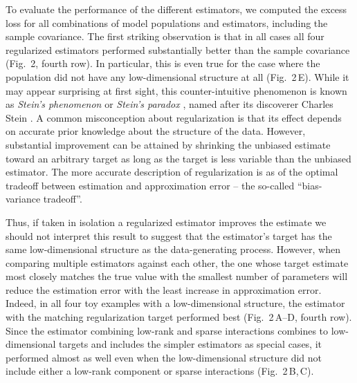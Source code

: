 To evaluate the performance of the different estimators, we computed the excess loss for all combinations of model populations and estimators, including the sample covariance. The first striking observation is that in all cases all four regularized estimators performed substantially better than the sample covariance (Fig.~2, fourth row). In particular, this is even true for the case where the population did not have any low-dimensional structure at all (Fig.~2\,E). While it may appear surprising at first sight, this counter-intuitive phenomenon is known as \emph{Stein's phenomenon} or \emph{Stein's paradox} \cite{Efron:1977}, named after its discoverer Charles Stein \cite{Stein:1956}. A common misconception about regularization is that its effect depends on accurate prior knowledge about the structure of the data. However, substantial improvement can be attained by shrinking the unbiased estimate toward an arbitrary target as long as the target is less variable than the unbiased estimator. The more accurate description of regularization is as of the optimal tradeoff between estimation and approximation error -- the so-called ``bias-variance tradeoff''.

Thus, if taken in isolation a regularized estimator improves the estimate we should not interpret this result to suggest that the estimator's target has the same low-dimensional structure as the data-generating process. However, when comparing multiple estimators against each other, the one whose target estimate most closely matches the true value with the smallest number of parameters will reduce the estimation error with the least increase in approximation error. Indeed, in all four toy examples with a low-dimensional structure, the estimator with the matching regularization target performed best (Fig.~2\,A--D, fourth row). Since the estimator combining low-rank and sparse interactions combines to low-dimensional targets and includes the simpler estimators as special cases, it performed almost as well even when the low-dimensional structure did not include either a low-rank component or sparse interactions (Fig.~2\,B,\,C).  

